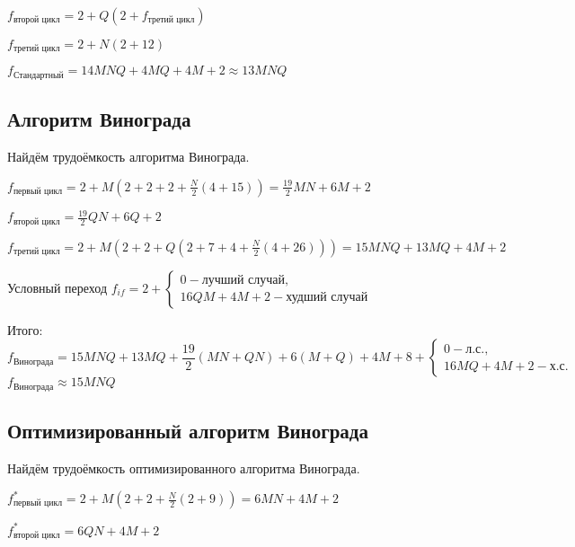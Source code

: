             $ f_\text{второй цикл} = 2 + Q(2 + f_\text{третий цикл})$  

            $ f_\text{третий цикл} = 2 + N(2 + 12)$  

            $ f_\text{Стандартный} = 14MNQ + 4MQ + 4M + 2 \approx 13MNQ$

        \subsection{Алгоритм Винограда}
            Найдём трудоёмкость алгоритма Винограда.
            
            $ f_\text{первый цикл} = 2 + M(2 + 2 + 2 + \frac{N}{2}(4 + 15)) = \frac{19}{2}MN + 6M + 2$
            
            $ f_\text{второй цикл} = \frac{19}{2}QN + 6Q + 2$

            $ f_\text{третий цикл} = 2 + M(2 + 2 + Q(2 + 7 + 4 + \frac{N}{2}(4 + 26))) = 15MNQ + 13MQ + 4M + 2$

            Условный переход $f_{if} = 2 + \left\{
                \begin{matrix}
                0 - \text{лучший случай},\\
                16QM + 4M + 2 - \text{худший случай} 
                \end{matrix}\right.$

            Итого:
            \begin{equation}
                f_\text{Винограда} = 15MNQ + 13MQ + \frac{19}{2}(MN + QN) + 6(M + Q) + 4M + 8 + 
                    \left\{ \begin{matrix}
                    0 - \text{л.с.},\\
                    16MQ + 4M + 2 - \text{х.с.} 
                    \end{matrix}\right.
            \end{equation}
            $ f_\text{Винограда} \approx 15MNQ $
        \subsection{Оптимизированный алгоритм Винограда}

            Найдём трудоёмкость оптимизированного алгоритма Винограда.
                
            $ f_\text{первый цикл}^* = 2 + M(2 + 2 + \frac{N}{2}(2 + 9)) = 6MN + 4M + 2$
            
            $ f_\text{второй цикл}^* = 6QN + 4M + 2$

